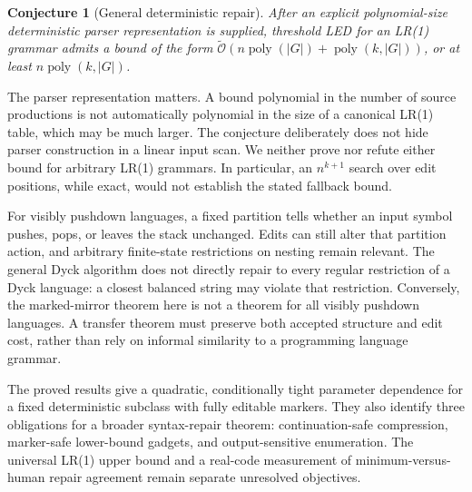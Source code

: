 \documentclass[sigconf,screen]{acmart}
\newcommand{\softO}{\widetilde{\mathcal O}}
\newtheorem{conjecture}[theorem]{Conjecture}
\theoremstyle{definition}
\begin{document}
\begin{conjecture}[General deterministic repair]\label{conj:lr}
After an explicit polynomial-size deterministic parser representation is supplied, threshold LED for an LR(1) grammar admits a bound of the form $\softO(n\operatorname{poly}(|G|)+\operatorname{poly}(k,|G|))$, or at least $n\operatorname{poly}(k,|G|)$.
\end{conjecture}

The parser representation matters. A bound polynomial in the number of source productions is not automatically polynomial in the size of a canonical LR(1) table, which may be much larger. The conjecture deliberately does not hide parser construction in a linear input scan. We neither prove nor refute either bound for arbitrary LR(1) grammars. In particular, an $n^{k+1}$ search over edit positions, while exact, would not establish the stated fallback bound.

For visibly pushdown languages, a fixed partition tells whether an input symbol pushes, pops, or leaves the stack unchanged. Edits can still alter that partition action, and arbitrary finite-state restrictions on nesting remain relevant. The general Dyck algorithm does not directly repair to every regular restriction of a Dyck language: a closest balanced string may violate that restriction. Conversely, the marked-mirror theorem here is not a theorem for all visibly pushdown languages. A transfer theorem must preserve both accepted structure and edit cost, rather than rely on informal similarity to a programming language grammar.

The proved results give a quadratic, conditionally tight parameter dependence for a fixed deterministic subclass with fully editable markers. They also identify three obligations for a broader syntax-repair theorem: continuation-safe compression, marker-safe lower-bound gadgets, and output-sensitive enumeration. The universal LR(1) upper bound and a real-code measurement of minimum-versus-human repair agreement remain separate unresolved objectives.

\balance
\makeatletter\@ACM@balancefalse\makeatother


\end{document}
